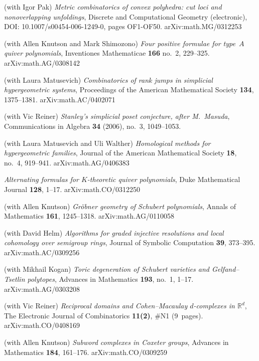 \documentclass[11pt]{proposal}
\def\bibyear#1{\makebox[-1ex][l]{}\marginpar[{\flushright{\small#1}}]{}}
\begin{document}
\begin{thebibliography}{33}
\bibyear{2006}
(with Igor Pak) \emph{Metric combinatorics of convex polyhedra: cut
	loci and nonoverlapping unfoldings}, Discrete and
	Computational Geometry (electronic), DOI:
	10.1007/s00454-006-1249-0, pages OF1-OF50.
	\textsf{arXiv:math.MG/0312253}

(with Allen Knutson and Mark Shimozono) \emph{Four positive formulae
	for type~$A$ quiver polynomials}, Inventiones Mathematicae
	\textbf{166} no.~2, 229--325.  \textsf{arXiv:math.AG/0308142}

(with Laura Matusevich) \emph{Combinatorics of rank jumps in
	simplicial hypergeometric systems}, Proceedings of the
	American Mathematical Society \textbf{134}, 1375--1381.
	\textsf{arXiv:math.AC/0402071}

(with Vic Reiner) \emph{Stanley's simplicial poset conjecture, after
	M.\ Masuda}, Communications in Algebra \textbf{34} (2006),
	no.~3, 1049--1053.
     
\bibyear{2005}
(with Laura Matusevich and Uli Walther) \emph{Homological methods for
	hypergeometric families}, Journal of the American Mathematical
	Society \textbf{18}, no.~4, 919--941.  \textsf{arXiv:math.AG/0406383}

\emph{Alternating formulas for $K$-theoretic quiver polynomials},
	Duke Mathematical Journal \textbf{128}, 1--17.
	\textsf{arXiv:math.CO/0312250}

(with Allen Knutson) \emph{Gr\"obner geometry of Schubert
	polynomials}, Annals of Mathematics \textbf{161}, 1245--1318.
	\textsf{arXiv:math.AG/0110058}

(with David Helm) \emph{Algorithms for graded injective resolutions
	and local cohomology over semigroup rings}, Journal of
	Symbolic Computation \textbf{39}, 373--395.
	\textsf{arXiv:math.AC/0309256}

(with Mikhail Kogan) \emph{Toric degeneration of Schubert varieties
	and Gelfand--Tsetlin polytopes}, Advances in Mathematics
	\textbf{193}, no.~1, 1--17.  \textsf{arXiv:math.AG/0303208}

(with Vic Reiner) \emph{Reciprocal domains and Cohen--Macaulay
	$d$-complexes in ${\mathbb R}^d$}, The Electronic Journal of
	Combinatorics \textbf{11(2)}, \#N1 (9~pages).
	\textsf{arXiv:math.CO/0408169}

\bibyear{2004}
(with Allen Knutson) \emph{Subword complexes in Coxeter groups},
	Advances in Mathematics \textbf{184}, 161--176.
	\textsf{arXiv:math.CO/0309259}


\end{thebibliography}
\end{document}

